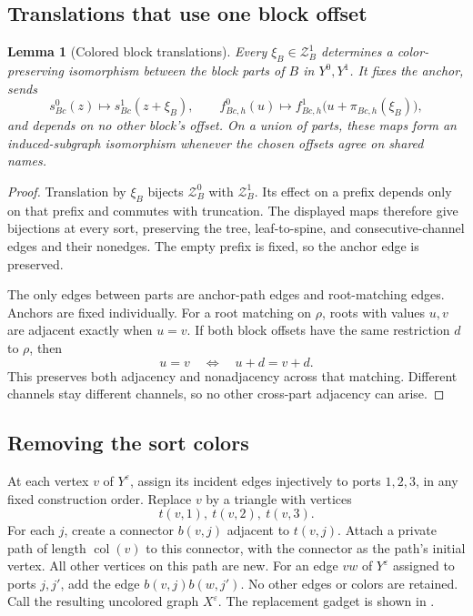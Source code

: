 \documentclass[11pt]{article}
\newtheorem{lemma}[theorem]{Lemma}
\theoremstyle{definition}
\newcommand{\cZ}{\mathcal Z}
\newcommand{\eps}{\varepsilon}
\begin{document}
\subsection{Translations that use one block offset}

\begin{lemma}[Colored block translations]
\label{graph:colored-translations}
Every \(\xi_B\in\cZ_B^1\) determines a color-preserving isomorphism
between the block parts of \(B\) in \(Y^0,Y^1\).
It fixes the anchor, sends
\[
 s_{Bc}^0(z)\longmapsto s_{Bc}^1(z+\xi_B),
 \qquad
 f_{Bc,h}^0(u)\longmapsto
 f_{Bc,h}^1\bigl(u+\pi_{Bc,h}(\xi_B)\bigr),
\]
and depends on no other block's offset.
On a union of parts, these maps form an induced-subgraph
isomorphism whenever the chosen offsets agree on shared names.
\end{lemma}

\begin{proof}
Translation by \(\xi_B\) bijects \(\cZ_B^0\) with \(\cZ_B^1\).
Its effect on a prefix depends only on that prefix and commutes with
truncation.  The displayed maps therefore give bijections at every
sort, preserving the tree, leaf-to-spine, and consecutive-channel
edges and their nonedges.
The empty prefix is fixed, so the anchor edge is preserved.

The only edges between parts are anchor-path edges and root-matching
edges.  Anchors are fixed individually.
For a root matching on \(\rho\), roots with values \(u,v\) are
adjacent exactly when \(u=v\).
If both block offsets have the same restriction \(d\) to \(\rho\),
then
\[
                       u=v\quad\Longleftrightarrow\quad u+d=v+d.
\]
This preserves both adjacency and nonadjacency across that matching.
Different channels stay different channels, so no other cross-part
adjacency can arise.
\end{proof}

\subsection{Removing the sort colors}

At each vertex \(v\) of \(Y^\eps\), assign its incident edges injectively
to ports \(1,2,3\), in any fixed construction order.
Replace \(v\) by a triangle with vertices
\[
                       t(v,1),\ t(v,2),\ t(v,3).
\]
For each \(j\), create a connector \(b(v,j)\) adjacent to \(t(v,j)\).
Attach a private path of length \(\operatorname{col}(v)\) to this
connector, with the connector as the path's initial vertex.
All other vertices on this path are new.
For an edge \(vw\) of \(Y^\eps\) assigned to ports \(j,j'\), add the
edge \(b(v,j)b(w,j')\).
No other edges or colors are retained.
Call the resulting uncolored graph \(X^\eps\).
The replacement gadget is shown in .
\end{document}
